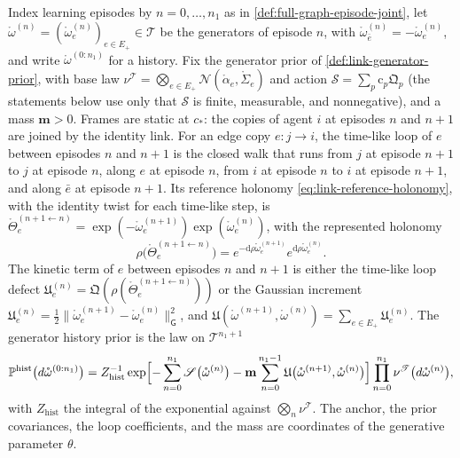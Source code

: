 Index learning episodes by $n=0,\ldots,n_1$ as in \cref{def:full-graph-episode-joint}, let
$\mathring\omega^{(n)}=(\mathring\omega^{(n)}_e)_{e\in E_+}\in\mathscr T$ be the generators of episode
$n$, with $\mathring\omega^{(n)}_{\bar e}=-\mathring\omega^{(n)}_e$, and write
$\mathring\omega^{(0:n_1)}$ for a history. Fix the generator prior of \cref{def:link-generator-prior},
with base law $\nu^{\mathscr T}=\bigotimes_{e\in E_+}\mathcal N(\mathring\alpha_e,\mathring\Sigma_e)$ and
action $\mathscr S=\sum_p\mathrm c_p\mathfrak Q_p$ (the statements below use only that $\mathscr S$ is
finite, measurable, and nonnegative), and a mass $\mathbf m>0$. Frames are static at $c_*$: the copies
of agent $i$ at episodes $n$ and $n+1$ are joined by the identity link. For an edge copy $e:j\to i$,
the time-like loop of $e$ between episodes $n$ and $n+1$ is the closed walk that runs from $j$ at
episode $n+1$ to $j$ at episode $n$, along $e$ at episode $n$, from $i$ at episode $n$ to $i$ at
episode $n+1$, and along $\bar e$ at episode $n+1$. Its reference holonomy
\eqref{eq:link-reference-holonomy}, with the identity twist for each time-like step, is
$\mathring\Theta^{(n+1\leftarrow n)}_e=\exp(-\mathring\omega^{(n+1)}_e)\exp(\mathring\omega^{(n)}_e)$, with
the represented holonomy
\begin{equation}
\rho\bigl(\mathring\Theta^{(n+1\leftarrow n)}_e\bigr)=e^{-\mathrm d\rho\mathring\omega^{(n+1)}_e}e^{\mathrm d\rho\mathring\omega^{(n)}_e}.
\label{eq:link-timelike-holonomy}
\end{equation}
The kinetic term of $e$ between episodes $n$ and $n+1$ is either the time-like loop defect
$\mathfrak U^{(n)}_e=\mathfrak Q(\rho(\mathring\Theta^{(n+1\leftarrow n)}_e))$ or the Gaussian increment
$\mathfrak U^{(n)}_e=\tfrac12\lVert\mathring\omega^{(n+1)}_e-\mathring\omega^{(n)}_e\rVert_{\mathsf G}^2$,
and $\mathfrak U(\mathring\omega^{(n+1)},\mathring\omega^{(n)})=\sum_{e\in E_+}\mathfrak U^{(n)}_e$. The
generator history prior is the law on $\mathscr T^{n_1+1}$
\begin{equation}
\mathbb P^{\mathrm{hist}}\bigl(d\mathring\omega^{(0:n_1)}\bigr)
=Z_{\mathrm{hist}}^{-1}\exp\Bigl[-\sum_{n=0}^{n_1}\mathscr S\bigl(\mathring\omega^{(n)}\bigr)
-\mathbf m\sum_{n=0}^{n_1-1}\mathfrak U\bigl(\mathring\omega^{(n+1)},\mathring\omega^{(n)}\bigr)\Bigr]
\prod_{n=0}^{n_1}\nu^{\mathscr T}\bigl(d\mathring\omega^{(n)}\bigr),
\label{eq:link-history-prior}
\end{equation}
with $Z_{\mathrm{hist}}$ the integral of the exponential against $\bigotimes_n\nu^{\mathscr T}$. The
anchor, the prior covariances, the loop coefficients, and the mass are coordinates of the generative
parameter $\theta$.

